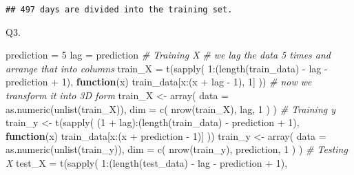 \documentclass[
]{article}
\newenvironment{Shaded}{\begin{snugshade}}{\end{snugshade}}
\newcommand{\AttributeTok}[1]{\textcolor[rgb]{0.77,0.63,0.00}{#1}}
\newcommand{\CommentTok}[1]{\textcolor[rgb]{0.56,0.35,0.01}{\textit{#1}}}
\newcommand{\ControlFlowTok}[1]{\textcolor[rgb]{0.13,0.29,0.53}{\textbf{#1}}}
\newcommand{\DecValTok}[1]{\textcolor[rgb]{0.00,0.00,0.81}{#1}}
\newcommand{\FunctionTok}[1]{\textcolor[rgb]{0.00,0.00,0.00}{#1}}
\newcommand{\NormalTok}[1]{#1}
\newcommand{\OtherTok}[1]{\textcolor[rgb]{0.56,0.35,0.01}{#1}}
\newcommand{\SpecialCharTok}[1]{\textcolor[rgb]{0.00,0.00,0.00}{#1}}
\begin{document}
\begin{verbatim}
## 497 days are divided into the training set.
\end{verbatim}

Q3.

\begin{Shaded}
\begin{Highlighting}[]
\NormalTok{prediction }\OtherTok{=} \DecValTok{5}
\NormalTok{lag }\OtherTok{=}\NormalTok{ prediction}
\CommentTok{\# Training X}
\CommentTok{\# we lag the data 5 times and arrange that into columns}
\NormalTok{train\_X }\OtherTok{=} \FunctionTok{t}\NormalTok{(}\FunctionTok{sapply}\NormalTok{(}
    \DecValTok{1}\SpecialCharTok{:}\NormalTok{(}\FunctionTok{length}\NormalTok{(train\_data) }\SpecialCharTok{{-}}\NormalTok{ lag }\SpecialCharTok{{-}}\NormalTok{ prediction }\SpecialCharTok{+} \DecValTok{1}\NormalTok{),}
    \ControlFlowTok{function}\NormalTok{(x) train\_data[x}\SpecialCharTok{:}\NormalTok{(x }\SpecialCharTok{+}\NormalTok{ lag }\SpecialCharTok{{-}} \DecValTok{1}\NormalTok{), }\DecValTok{1}\NormalTok{]}
\NormalTok{  ))}
\CommentTok{\# now we transform it into 3D form}
\NormalTok{train\_X }\OtherTok{\textless{}{-}} \FunctionTok{array}\NormalTok{(}
    \AttributeTok{data =} \FunctionTok{as.numeric}\NormalTok{(}\FunctionTok{unlist}\NormalTok{(train\_X)),}
    \AttributeTok{dim =} \FunctionTok{c}\NormalTok{(}
        \FunctionTok{nrow}\NormalTok{(train\_X),}
\NormalTok{        lag,}
        \DecValTok{1}
\NormalTok{    )}
\NormalTok{)}
\CommentTok{\# Training y}
\NormalTok{train\_y }\OtherTok{\textless{}{-}} \FunctionTok{t}\NormalTok{(}\FunctionTok{sapply}\NormalTok{(}
\NormalTok{    (}\DecValTok{1} \SpecialCharTok{+}\NormalTok{ lag)}\SpecialCharTok{:}\NormalTok{(}\FunctionTok{length}\NormalTok{(train\_data) }\SpecialCharTok{{-}}\NormalTok{ prediction }\SpecialCharTok{+} \DecValTok{1}\NormalTok{),}
    \ControlFlowTok{function}\NormalTok{(x) train\_data[x}\SpecialCharTok{:}\NormalTok{(x }\SpecialCharTok{+}\NormalTok{ prediction }\SpecialCharTok{{-}} \DecValTok{1}\NormalTok{)]}
\NormalTok{))}
\NormalTok{train\_y }\OtherTok{\textless{}{-}} \FunctionTok{array}\NormalTok{(}
    \AttributeTok{data =} \FunctionTok{as.numeric}\NormalTok{(}\FunctionTok{unlist}\NormalTok{(train\_y)),}
    \AttributeTok{dim =} \FunctionTok{c}\NormalTok{(}
        \FunctionTok{nrow}\NormalTok{(train\_y),}
\NormalTok{        prediction,}
        \DecValTok{1}
\NormalTok{    )}
\NormalTok{)}
\CommentTok{\# Testing X}
\NormalTok{test\_X }\OtherTok{=} \FunctionTok{t}\NormalTok{(}\FunctionTok{sapply}\NormalTok{(}
    \DecValTok{1}\SpecialCharTok{:}\NormalTok{(}\FunctionTok{length}\NormalTok{(test\_data) }\SpecialCharTok{{-}}\NormalTok{ lag }\SpecialCharTok{{-}}\NormalTok{ prediction }\SpecialCharTok{+} \DecValTok{1}\NormalTok{),}

\end{Highlighting}
\end{Shaded}
\end{document}
